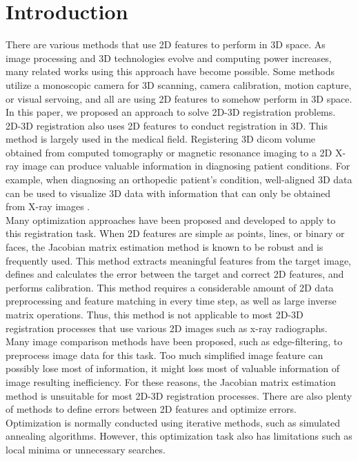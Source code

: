 \documentclass[10pt]{article}
\begin{document}
\newpage
\section{Introduction}
 There are various methods that use 2D features to perform in 3D space. As image processing and 3D technologies evolve and computing power increases, many related works using this approach have become possible. Some methods utilize a monoscopic camera for 3D scanning\cite{3dscanning}, camera calibration\cite{cameracalibration}, motion capture\cite{motioncapture}, or visual servoing\cite{visualservoing}, and all are using 2D features to somehow perform in 3D space. In this paper, we proposed an approach to solve 2D-3D registration problems. 2D-3D registration also uses 2D features to conduct registration in 3D. This method is largely used in the medical field. Registering 3D dicom volume obtained from computed tomography or magnetic resonance imaging to a 2D X-ray image can produce valuable information in diagnosing patient conditions. For example, when diagnosing an orthopedic patient's condition, well-aligned 3D data can be used to visualize 3D data with information that can only be obtained from X-ray images \cite{femoral, tka}.\\
 Many optimization approaches have been proposed and developed to apply to this registration task. When 2D features are simple as points, lines, or binary or faces, the Jacobian matrix estimation\cite{jacobianmatrix} method is known to be robust and is frequently used. This method extracts meaningful features from the target image, defines and calculates the error between the target and correct 2D features, and performs calibration. This method requires a considerable amount of 2D data preprocessing and feature matching in every time step, as well as large inverse matrix operations. Thus, this method is not applicable to most 2D-3D registration processes that use various 2D images such as x-ray radiographs. Many image comparison methods have been proposed, such as edge-filtering\cite{edge}, to preprocess image data for this task. Too much simplified image feature can possibly lose most of information, it might loss most of valuable information of image resulting inefficiency. For these reasons, the Jacobian matrix estimation method is unsuitable for most 2D-3D registration processes. There are also plenty of methods to define errors between 2D features \cite{validation} and optimize errors. Optimization is normally conducted using iterative methods, such as simulated annealing algorithms\cite{edge}. However, this optimization task also has limitations such as local minima or unnecessary searches.\\
\end{document}
